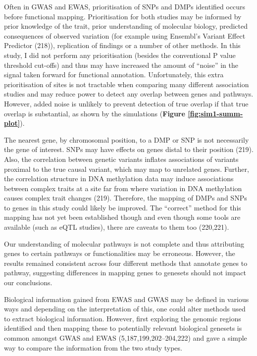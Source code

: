 \documentclass[11pt,twoside]{bristolthesis}
\begin{document}
Often in GWAS and EWAS, prioritisation of SNPs and DMPs identified occurs before functional mapping. Prioritisation for both studies may be informed by prior knowledge of the trait, prior understanding of molecular biology, predicted consequences of observed variation (for example using Ensembl's Variant Effect Predictor (218)), replication of findings or a number of other methods. In this study, I did not perform any prioritisation (besides the conventional P value threshold cut-offs) and thus may have increased the amount of ``noise'' in the signal taken forward for functional annotation. Unfortunately, this extra prioritisation of sites is not tractable when comparing many different association studies and may reduce power to detect any overlap between genes and pathways. However, added noise is unlikely to prevent detection of true overlap if that true overlap is substantial, as shown by the simulations (\textbf{Figure \ref{fig:sim1-summ-plot}}).

The nearest gene, by chromosomal position, to a DMP or SNP is not necessarily the gene of interest. SNPs may have effects on genes distal to their position (219). Also, the correlation between genetic variants inflates associations of variants proximal to the true causal variant, which may map to unrelated genes. Further, the correlation structure in DNA methylation data may induce associations between complex traits at a site far from where variation in DNA methylation causes complex trait changes (219). Therefore, the mapping of DMPs and SNPs to genes in this study could likely be improved. The ``correct'' method for this mapping has not yet been established though and even though some tools are available (such as eQTL studies), there are caveats to them too (220,221).

Our understanding of molecular pathways is not complete and thus attributing genes to certain pathways or functionalities may be erroneous. However, the results remained consistent across four different methods that annotate genes to pathway, suggesting differences in mapping genes to genesets should not impact our conclusions.

Biological information gained from EWAS and GWAS may be defined in various ways and depending on the interpretation of this, one could alter methods used to extract biological information. However, first exploring the genomic regions identified and then mapping these to potentially relevant biological genesets is common amongst GWAS and EWAS (5,187,199,202--204,222) and gave a simple way to compare the information from the two study types.
\end{document}
